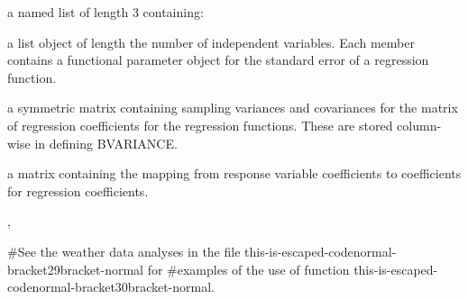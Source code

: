 \begin{Value}
a named list of length 3 containing:

\begin{ldescription}
\item[\code{betastderrlist}] a list object of length
the number of independent variables. Each member contains a
functional parameter object
for the standard error of a regression function.

\item[\code{bvar}] a symmetric matrix containing sampling variances and
covariances for the matrix of regression coefficients
for the regression functions.  These are stored
column-wise in defining BVARIANCE.

\item[\code{c2bMap}] a matrix containing the mapping from response variable
coefficients to coefficients for regression coefficients.

\end{ldescription}
\end{Value}
\begin{SeeAlso}\relax
{}, 
\end{SeeAlso}
\begin{Examples}
\begin{ExampleCode}
#See the weather data analyses in the file this-is-escaped-codenormal-bracket29bracket-normal for
#examples of the use of function this-is-escaped-codenormal-bracket30bracket-normal.
\end{ExampleCode}
\end{Examples}

